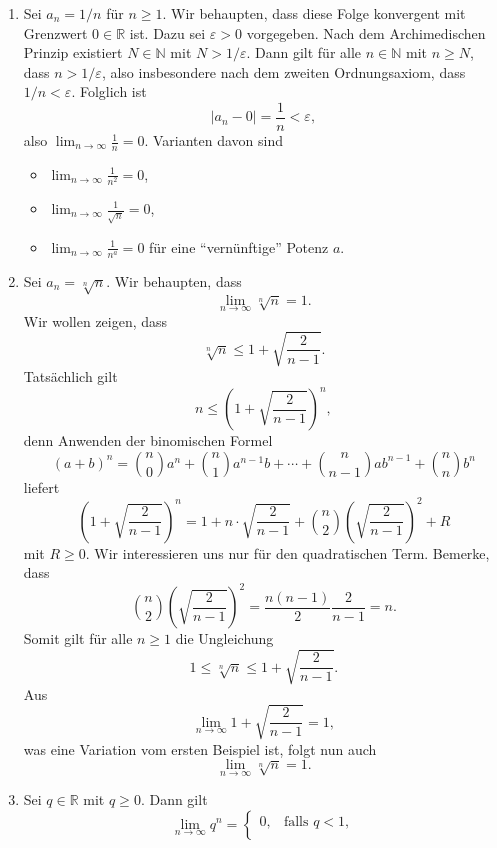 \documentclass[../main.tex]{subfiles}
\begin{document}
\begin{examples}
  \leavevmode
\begin{enumerate}[(1)]
  \item Sei $a_n = 1/n$ für $n \geq 1$. Wir behaupten,
	  dass diese Folge konvergent mit Grenzwert
	  $0 \in \mathbb{R}$ ist. Dazu sei $\varepsilon > 0$
	  vorgegeben.
	  Nach dem Archimedischen Prinzip
	  existiert $N \in \mathbb{N}$ mit
	  $N > 1/\varepsilon$.
	  Dann gilt für alle $n \in \mathbb{N}$ mit $n \geq N$,
	  dass $n > 1/\varepsilon$, also insbesondere
	  nach dem zweiten Ordnungsaxiom, dass
	  $1/n < \varepsilon$.
	  Folglich ist
	  \[
		  |a_n - 0| = \frac{1}{n} < \varepsilon,
	  \]
	  also
	  \(
		  \lim_{n \to \infty}\frac{1}{n} = 0.
	  \)
	  Varianten davon sind
	  \begin{itemize}
	    \item $\lim_{n \to \infty} \frac{1}{n^2} = 0$,
	    \item $\lim_{n \to \infty} \frac{1}{\sqrt n} = 0$,
	    \item $\lim_{n \to \infty} \frac{1}{n^a} = 0$ für
		    eine ``vernünftige'' Potenz $a$.
	  \end{itemize}
  \item Sei $a_n = \sqrt[n]{n}$. Wir behaupten, dass
	  \[
		  \lim_{n \to \infty} \sqrt[n]{n} = 1.
	  \]
	  Wir wollen zeigen, dass 
	  \[
		  \sqrt[n]{n} \leq 1 + \sqrt{\frac{2}{n-1}}.
	  \]
	  Tatsächlich gilt
	  \[
		  n  \leq {\left( 1 + \sqrt{\frac{2}{n-1}} \right)}^n,
	  \]
	  denn Anwenden der binomischen Formel
	  \[
		  {(a + b)}^n = \binom{n}{0}a^n + \binom{n}{1}a^{n-1}b
		  + \cdots + \binom{n}{n-1}ab^{n-1} + \binom{n}{n}b^n
	  \]
	  liefert
	  \[
		  {\left( 1 + \sqrt{\frac{2}{n-1}} \right)}^n
		  = 1 + n \cdot \sqrt{\frac{2}{n-1}}
		  + \binom{n}{2} {\left( \sqrt{\frac{2}{n-1}} \right)}^2
		  + R
	  \]
	  mit $R \geq 0$.
    Wir interessieren uns nur für den 
    quadratischen Term.
    Bemerke, dass
    \[
      \binom{n}{2}{\left( \sqrt{\frac{2}{n-1}} \right)}^2
      = \frac{n(n-1)}{2} \frac{2}{n-1} = n.
    \]
	  Somit gilt für alle $n \geq 1$ die Ungleichung
	  \[
		  1 \leq \sqrt[n]{n} \leq 1 + \sqrt{\frac{2}{n-1}}.
	  \]
	  Aus
	  \[
		  \lim_{n \to \infty} 1 + \sqrt{\frac{2}{n-1}} = 1,
	  \]
    was eine Variation vom ersten Beispiel ist, folgt nun auch
	  \[
		  \lim_{n \to \infty} \sqrt[n]{n} = 1.
	  \]
  \item Sei $q \in \mathbb{R}$ mit $q \geq 0$. Dann gilt
	  \[
	    \lim_{n \to \infty} q^n = 
	    \begin{cases}
		    0, & \text{falls } q < 1, \\

\end{cases}\]
\end{enumerate}
\end{examples}
\end{document}
